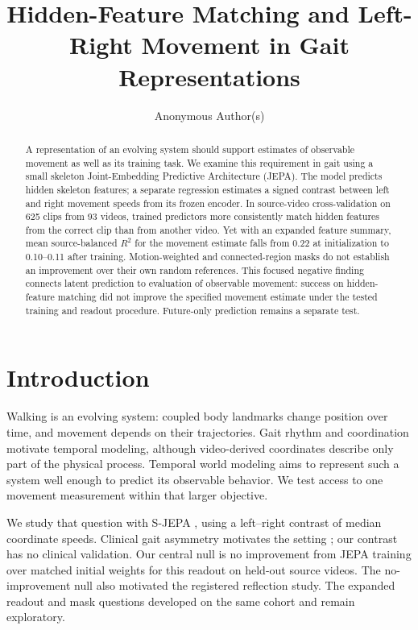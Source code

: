 \documentclass{article}
\title{Hidden-Feature Matching and Left-Right Movement in Gait Representations}
\author{Anonymous Author(s)}
\begin{document}
\maketitle
\begin{abstract}
A representation of an evolving system should support estimates of
observable movement as well as its training task. We examine this
requirement in gait using a small skeleton Joint-Embedding Predictive
Architecture (JEPA). The model predicts hidden skeleton features; a
separate regression estimates a signed contrast between left and right
movement speeds from its frozen encoder. In source-video
cross-validation on 625 clips from 93 videos, trained predictors more
consistently match hidden features from the correct clip than from
another video. Yet with an expanded feature summary, mean
source-balanced \(R^2\) for the movement estimate falls from 0.22 at
initialization to 0.10--0.11 after training. Motion-weighted and
connected-region masks do not establish an improvement over their own
random references. This focused negative finding connects latent
prediction to evaluation of observable movement: success on
hidden-feature matching did not improve the specified movement estimate
under the tested training and readout procedure. Future-only prediction
remains a separate test.
\end{abstract}
\section{Introduction}\label{introduction}

Walking is an evolving system: coupled body landmarks change position
over time, and movement depends on their trajectories. Gait rhythm and
coordination motivate temporal modeling, although video-derived
coordinates describe only part of the physical process. Temporal world
modeling aims to represent such a system well enough to predict its
observable behavior. We test access to one movement measurement within
that larger objective.

We study that question with S-JEPA \citep{sjepa}, using a left--right
contrast of median coordinate speeds. Clinical gait asymmetry motivates
the setting \citep{stroke}; our contrast has no clinical validation. Our
central null is no improvement from JEPA training over matched initial
weights for this readout on held-out source videos. The no-improvement
null also motivated the registered reflection study. The expanded
readout and mask questions developed on the same cohort and remain
exploratory.
\end{document}
